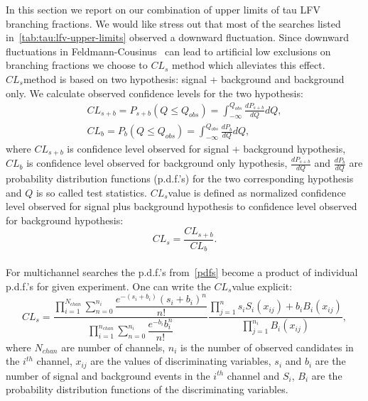 \newcommand{\fixme}{\color{red} FIXME!}

\label{sec:tau:lfv_com}
\def\cls{$CL_s$}

In this section we report on our combination of upper limits of tau LFV branching fractions. We would like stress out that most of the searches listed in~\ref{tab:tau:lfv-upper-limits} observed a downward fluctuation. Since downward fluctuations in Feldmann-Cousinus~\cite{FC} can lead to artificial low exclusions\cite{PDG} on branching fractions we choose to \cls\cite{cls} method which alleviates this effect. \\
\cls method is based on two hypothesis: signal + background and background only. We calculate observed confidence levels for the two hypothesis:
\begin{align}
CL_{s+b} = P_{s+b}(Q \leq Q_{obs}) = \int_{- \infty}^{Q_{obs}} \frac{dP_{s+b}}{dQ} dQ,\\
CL_{b} = P_{b}(Q \leq Q_{obs}) = \int_{- \infty}^{Q_{obs}} \frac{dP_{b}}{dQ} dQ,
\label{pdfs}
\end{align}
where $CL_{s+b}$ is confidence level observed for signal + background hypothesis, $CL_{b}$ is confidence level observed for background only hypothesis, $\frac{dP_{s+b}}{dQ}$ and $\frac{dP_{b}}{dQ}$ are probability distribution functions (p.d.f.'s) for the two corresponding hypothesis and $Q$ is so called test statistics. \cls value is defined as normalized confidence level observed for signal plus background hypothesis to confidence level observed for background hypothesis:
\begin{equation}
CL_s=\dfrac{CL_{s+b}}{CL_{b}}.
\end{equation}\\
For multichannel searches the p.d.f.'s from~\ref{pdfs} become a product of individual p.d.f.'s for given experiment. One can write the \cls value explicit:
\begin{equation}
CL_s = \dfrac{\prod_{i=1}^{N_{chan}}\sum_{n=0}^{n_i} \dfrac{e^{-(s_i+b_i)} (s_i+b_i)^{n}}{n!} }{\prod_{i=1}^{n_{chan}}  \sum_{n=0}^{n_i} \dfrac{e^{-b_i} b_i^{n}}{n!}}    \dfrac{\prod_{j=1}^{n} s_iS_i(x_{ij})+b_iB_i(x_{ij})}{\prod_{j=1}^{n_i}B_i(x_{ij})},
\end{equation}
where $N_{chan}$ are number of channels, $n_i$ is the number of observed candidates in the $i^{th}$ channel, $x_{ij}$ are the values of discriminating variables, $s_i$ and $b_i$ are the number of signal and background events in the $i^{th}$ channel and $S_i$, $B_i$ are the probability distribution functions of the discriminating variables. \\
